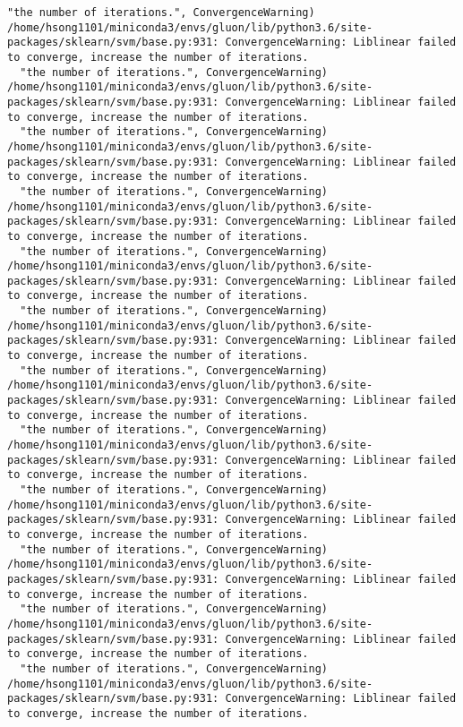 \documentclass[11pt]{article}
\begin{document}
\begin{Verbatim}[commandchars=\\\{\}]
  "the number of iterations.", ConvergenceWarning)
/home/hsong1101/miniconda3/envs/gluon/lib/python3.6/site-packages/sklearn/svm/base.py:931: ConvergenceWarning: Liblinear failed to converge, increase the number of iterations.
  "the number of iterations.", ConvergenceWarning)
/home/hsong1101/miniconda3/envs/gluon/lib/python3.6/site-packages/sklearn/svm/base.py:931: ConvergenceWarning: Liblinear failed to converge, increase the number of iterations.
  "the number of iterations.", ConvergenceWarning)
/home/hsong1101/miniconda3/envs/gluon/lib/python3.6/site-packages/sklearn/svm/base.py:931: ConvergenceWarning: Liblinear failed to converge, increase the number of iterations.
  "the number of iterations.", ConvergenceWarning)
/home/hsong1101/miniconda3/envs/gluon/lib/python3.6/site-packages/sklearn/svm/base.py:931: ConvergenceWarning: Liblinear failed to converge, increase the number of iterations.
  "the number of iterations.", ConvergenceWarning)
/home/hsong1101/miniconda3/envs/gluon/lib/python3.6/site-packages/sklearn/svm/base.py:931: ConvergenceWarning: Liblinear failed to converge, increase the number of iterations.
  "the number of iterations.", ConvergenceWarning)
/home/hsong1101/miniconda3/envs/gluon/lib/python3.6/site-packages/sklearn/svm/base.py:931: ConvergenceWarning: Liblinear failed to converge, increase the number of iterations.
  "the number of iterations.", ConvergenceWarning)
/home/hsong1101/miniconda3/envs/gluon/lib/python3.6/site-packages/sklearn/svm/base.py:931: ConvergenceWarning: Liblinear failed to converge, increase the number of iterations.
  "the number of iterations.", ConvergenceWarning)
/home/hsong1101/miniconda3/envs/gluon/lib/python3.6/site-packages/sklearn/svm/base.py:931: ConvergenceWarning: Liblinear failed to converge, increase the number of iterations.
  "the number of iterations.", ConvergenceWarning)
/home/hsong1101/miniconda3/envs/gluon/lib/python3.6/site-packages/sklearn/svm/base.py:931: ConvergenceWarning: Liblinear failed to converge, increase the number of iterations.
  "the number of iterations.", ConvergenceWarning)
/home/hsong1101/miniconda3/envs/gluon/lib/python3.6/site-packages/sklearn/svm/base.py:931: ConvergenceWarning: Liblinear failed to converge, increase the number of iterations.
  "the number of iterations.", ConvergenceWarning)
/home/hsong1101/miniconda3/envs/gluon/lib/python3.6/site-packages/sklearn/svm/base.py:931: ConvergenceWarning: Liblinear failed to converge, increase the number of iterations.
  "the number of iterations.", ConvergenceWarning)
/home/hsong1101/miniconda3/envs/gluon/lib/python3.6/site-packages/sklearn/svm/base.py:931: ConvergenceWarning: Liblinear failed to converge, increase the number of iterations.

\end{Verbatim}
\end{document}
